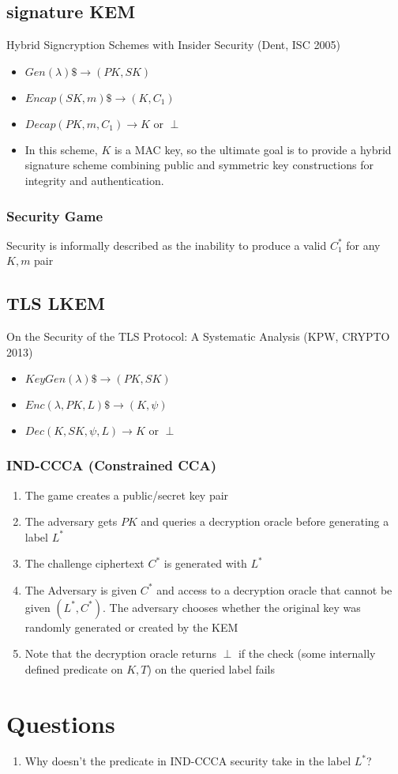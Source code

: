 \documentclass[11pt, pdftex]{article}
\begin{document}
\subsection{signature KEM} 
Hybrid Signcryption Schemes with Insider Security (Dent, ISC 2005)
\begin{itemize}
\item $Gen(\lambda) \$\rightarrow (PK, SK)$
\item $Encap(SK, m) \$\rightarrow (K, C_1)$
\item $Decap(PK, m, C_1) \rightarrow K \text{ or }\perp$
\item In this scheme, $K$ is a MAC key, so the ultimate goal is to provide a hybrid signature scheme
combining public and symmetric key constructions for integrity and authentication.
\end{itemize}

\subsubsection{Security Game}
Security is informally described as the inability to produce a valid $C^*_1$ for any $K,m$ pair

\subsection{TLS LKEM} 
On the Security of the TLS Protocol: A Systematic Analysis (KPW, CRYPTO 2013)
\begin{itemize}
\item $KeyGen(\lambda) \$\rightarrow (PK, SK)$
\item $Enc(\lambda, PK, L) \$\rightarrow (K, \psi)$
\item $Dec(K, SK, \psi, L) \rightarrow K \text{ or } \perp$
\end{itemize}

\subsubsection{IND-CCCA (Constrained CCA)}
\begin{enumerate}
\item The game creates a public/secret key pair
\item The adversary gets $PK$ and queries a decryption oracle before generating a label $L^*$
\item The challenge ciphertext $C^*$ is generated with $L^*$
\item The Adversary is given $C^*$ and access to a decryption oracle that cannot be given $(L^*, C^*)$.  The adversary chooses whether the original key was randomly generated or created by the KEM
\item Note that the decryption oracle returns $\perp$ if the check (some internally defined predicate on $K,T$) on the queried label fails
\end{enumerate}

\section{Questions}
\begin{enumerate}
\item Why doesn't the predicate in IND-CCCA security take in the label $L^*$?
\end{enumerate}
\end{document}
